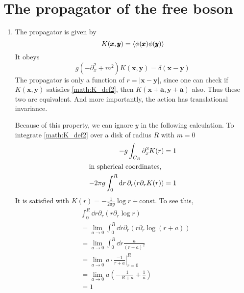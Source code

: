 \section{The propagator of the free boson}
\begin{enumerate}[label=(\alph*)]
	\item The propagator is given by
		\begin{equation}
			K(\pmb{x},\pmb{y}) = \expval{\phi(\pmb{x})\phi(\pmb{y})}
		\end{equation}
		It obeys
		\begin{equation}
			g(-\partial_x^2 + m^2) K(\pmb{x},\pmb{y}) = \delta(\pmb{x} - \pmb{y})
			\label{math:K_def2}
		\end{equation}
		The propagator is only a function of $r=|\pmb{x}-\pmb{y}|$, since one can check if $K(\pmb{x},\pmb{y})$ satisfies \eqref{math:K_def2}, then $K(\pmb{x}+\pmb{a},\pmb{y}+\pmb{a})$ also. Thus these two are equivalent. And more importantly, the action has translational invariance.

		Because of this property, we can ignore $y$ in the following calculation. To integrate \eqref{math:K_def2} over a disk of radius $R$ with $m=0$
		\begin{align*}
			-g \int_{C_R} \partial_x^2 K(r) &= 1 \\
			\shortintertext{in spherical coordinates,}
			-2\pi g \int_0^R \dd{r} \partial_r(r \partial_r K(r)) &= 1
		\end{align*}
		It is satisfied with $K(r) = -\frac{1}{2\pi g }\log r + \text{const}$. To see this,
		\begin{align*}
			&\int_0^R \dd{r} \partial_r (r \partial_r \log r) \\
			&= \lim_{a\rightarrow 0}  \int_0^R \dd{r} \partial_r (r \partial_r \log (r+a)) \\
			&= \lim_{a\rightarrow 0} \int_0^R \dd{r} \frac{a}{(r+a)^2} \\
			&= \lim_{a\rightarrow 0} a \cdot \left.\frac{-1}{r+a}\right|_{r=0}^R \\
			&= \lim_{a\rightarrow 0} a \left( - \frac{1}{R + a} + \frac{1}{a}  \right) \\
			&= 1
		\end{align*}



\end{enumerate}
